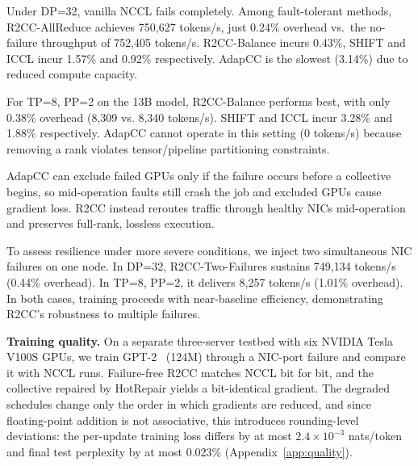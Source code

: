 Under DP=32, vanilla NCCL fails completely. Among fault-tolerant methods, R2CC-AllReduce achieves 750,627 tokens/s, just 0.24\% overhead vs.\ the no-failure throughput of 752,405 tokens/s. R2CC-Balance incurs 0.43\%, SHIFT and ICCL incur 1.57\% and 0.92\% respectively. AdapCC is the slowest (3.14\%) due to reduced compute capacity.

For TP=8, PP=2 on the 13B model, R2CC-Balance performs best, with only 0.38\% overhead (8,309 vs. 8,340 tokens/s). SHIFT and ICCL incur 3.28\% and 1.88\% respectively. AdapCC cannot operate in this setting (0 tokens/s) because removing a rank violates tensor/pipeline partitioning constraints.

AdapCC can exclude failed GPUs only if the failure occurs before a collective begins, so mid-operation faults still crash the job and excluded GPUs cause gradient loss. R2CC instead reroutes traffic through healthy NICs mid-operation and preserves full-rank, lossless execution.

To assess resilience under more severe conditions, we inject two simultaneous NIC failures on one node. In DP=32, R2CC-Two-Failures sustains 749,134 tokens/s (0.44\% overhead). In TP=8, PP=2, it delivers 8,257 tokens/s (1.01\% overhead). In both cases, training proceeds with near-baseline efficiency, demonstrating R2CC's robustness to multiple failures.

\smallskip\noindent\textbf{Training quality.} On a separate three-server testbed with six NVIDIA Tesla V100S GPUs, we train GPT-2~\cite{radford2019language} (124M) through a NIC-port failure and compare it with NCCL runs. Failure-free R2CC matches NCCL bit for bit, and the collective repaired by HotRepair yields a bit-identical gradient. The degraded schedules change only the order in which gradients are reduced, and since floating-point addition is not associative, this introduces rounding-level deviations: the per-update training loss differs by at most $2.4\times10^{-3}$ nats/token and final test perplexity by at most 0.023\% (Appendix~\ref{app:quality}).

